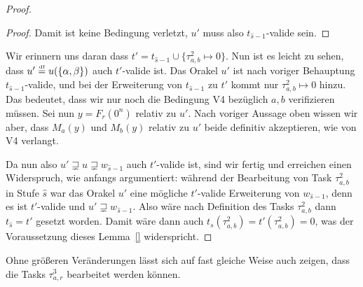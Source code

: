 \begin{proof}
\begin{proof}
    Damit ist keine Bedingung verletzt, $u'$ muss also $t_{\hat{s}-1}$-valide sein.
\end{proof}
Wir erinnern uns daran dass $t'=t_{\hat{s}-1}\cup \{\tau^2_{a,b}\mapsto 0\}$.
Nun ist es leicht zu sehen, dass $u'\stackrel{\text{\smash{\tiny df}}}{=} u(\{\alpha,\beta\})$ auch $t'$-valide ist. Das Orakel $u'$ ist nach voriger Behauptung $t_{\hat{s}-1}$-valide, und bei der Erweiterung von $t_{\hat{s}-1}$ zu $t'$ kommt nur $\tau^2_{a,b}\mapsto 0$ hinzu. Das bedeutet, dass wir nur noch die Bedingung V4 bezüglich $a,b$ verifizieren müssen.
Sei nun $y=F_r(0^n)$ relativ zu $u'$.
Nach voriger Aussage oben wissen wir aber, dass $M_a(y)$ und $M_b(y)$ relativ zu $u'$ beide definitiv akzeptieren, wie von V4 verlangt.

Da nun also $u'\sqsupsetneq u \sqsupsetneq w_{\hat{s}-1}$ auch $t'$-valide ist, sind wir fertig und erreichen einen Widerspruch, wie anfangs argumentiert: während der Bearbeitung von Task $\tau^2_{a,b}$ in Stufe $\hat{s}$ war das Orakel $u'$ eine mögliche $t'$-valide Erweiterung von $w_{\hat{s}-1}$, denn es ist $t'$-valide und $u'\sqsupsetneq w_{\hat{s}-1}$. Also wäre nach Definition des Tasks $\tau^2_{a,b}$ dann $t_{\hat{s}}=t'$ gesetzt worden.
Damit wäre dann auch $t_{s}(\tau^2_{a,b})=t'(\tau^2_{a,b})=0$, was der Voraussetzung dieses Lemma~\ref{} widerspricht.
\end{proof}

Ohne größeren Veränderungen lässt sich auf fast gleiche Weise auch zeigen, dass die Tasks $\tau^3_{a,r}$ bearbeitet werden können.

